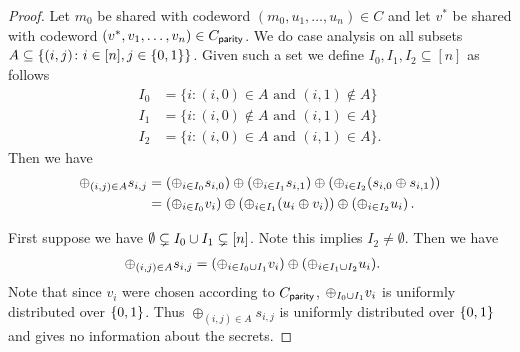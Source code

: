 \begin{proof}
	Let $m_0$ be shared with codeword $(m_0, u_1,\dotsc, u_n) \in C$ and let $v^*$ be shared with codeword $(v^*, v_1,\dotsc,v_n) \in C_\mathsf{parity}$.
	We do case analysis on all subsets $A \subseteq \{ (i,j) \colon i \in [n], j \in {\{0,1\}} \}$.
	Given such a set we define $I_0, I_1, I_2 \subseteq [n]$ as follows
	\begin{align*}
		I_0 &= \{ i \colon (i,0) \in A \text{ and } (i,1)\not\in A\}\\
		I_1 &= \{ i \colon (i,0) \not\in A \text{ and } (i,1)\in A\}\\
		I_2 &= \{ i \colon (i,0) \in A \text{ and } (i,1)\in A\}.
	\end{align*}
	Then we have
	\begin{align*}
		\oplus_{(i,j) \in A} s_{i,j} &= \left(\oplus_{i \in I_0} s_{i,0}\right) \oplus \left( \oplus_{i \in I_1} s_{i,1} \right) \oplus \left( \oplus_{i \in I_2}(s_{i,0} \oplus s_{i,1}) \right)\\
		&= \left( \oplus_{i \in I_0} v_i \right) \oplus \left( \oplus_{i \in I_1} (u_i \oplus v_i) \right) \oplus \left(\oplus_{i \in I_2} u_i\right).
	\end{align*}
	
	First suppose we have $\emptyset \subsetneq I_0 \cup I_1 \subsetneq [n]$.
	Note this implies $I_2 \neq \emptyset$.
	Then we have
	\begin{align*}
		\oplus_{(i,j) \in A} s_{i,j} &= (\oplus_{i \in I_0\cup I_1} v_i) \oplus (\oplus_{i \in I_1 \cup I_2} u_i).
	\end{align*}
	Note that since $v_i$ were chosen according to $C_\mathsf{parity}$, $\oplus_{I_0 \cup I_1} v_i$ is uniformly distributed over ${\{0,1\}}$. 
	Thus $\oplus_{(i,j) \in A} s_{i,j}$ is uniformly distributed over ${\{0,1\}}$ and gives no information about the secrets.
	

\end{proof}
